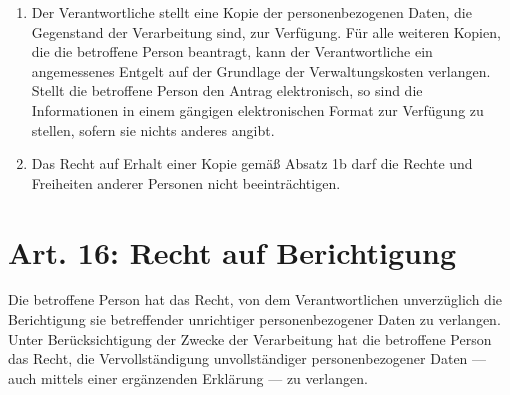 \begin{enumerate}[label=(\arabic*)]
            \item Der Verantwortliche stellt eine Kopie der personenbezogenen Daten, die Gegenstand der Verarbeitung sind, zur Verfügung. Für alle weiteren Kopien, die die betroffene Person beantragt, kann der Verantwortliche ein angemessenes Entgelt auf der Grundlage der Verwaltungskosten verlangen. Stellt die betroffene Person den Antrag elektronisch, so sind die Informationen in einem gängigen elektronischen Format zur Verfügung zu stellen, sofern sie nichts anderes angibt.
            \item Das Recht auf Erhalt einer Kopie gemäß Absatz 1b darf die Rechte und Freiheiten anderer Personen nicht beeinträchtigen. 
        \end{enumerate}

    \section{Art. 16: Recht auf Berichtigung}
        Die betroffene Person hat das Recht, von dem Verantwortlichen unverzüglich die Berichtigung sie betreffender unrichtiger personenbezogener Daten zu verlangen. Unter Berücksichtigung der Zwecke der Verarbeitung hat die betroffene Person das Recht, die Vervollständigung unvollständiger personenbezogener Daten — auch mittels einer ergänzenden Erklärung — zu verlangen.




